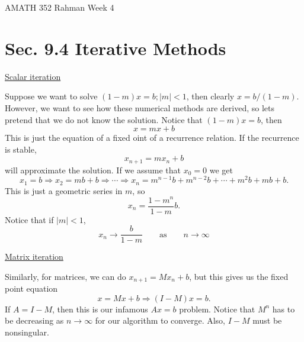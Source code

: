 \documentclass[reqno]{amsart}
\theoremstyle{definition}
\begin{document}
\begin{flushleft}
{\sc \Large AMATH 352 Rahman} \hfill Week 4
\bigskip
\end{flushleft}

\newcommand{\R}{\mathbb{R}}
\newcommand{\N}{\mathbb{N}}
\newcommand{\Z}{\mathbb{Z}}
\newcommand{\Q}{\mathbb{Q}}
\renewcommand{\CancelColor}{\color{red}}
\newcommand{\?}{\stackrel{?}{=}}
\renewcommand{\varphi}{\phi}
\newcommand{\card}{\text{Card}}
\newcommand{\bigzero}{\text{\Huge 0}}
\newcommand{\curvearrowdown}{{\color{red}\rotatebox{90}{$\curvearrowleft$}}}
\newcommand{\curvearrowup}{{\color{red}\rotatebox{90}{$\curvearrowright$}}}



\section*{Sec. 9.4 Iterative Methods}

\bigskip

\underline{\color{blue}Scalar iteration}

Suppose we want to solve $(1-m)x = b; |m| < 1$, then clearly $x = b/(1-m)$.  However, we want to see how these numerical methods are derived, so lets pretend that we do not know the solution.  Notice that $(1-m)x = b$, then
%
\begin{equation}
x = mx + b
\end{equation}
%
This is just the equation of a fixed oint of a recurrence relation.  If the recurrence is stable,
%
\begin{equation}
x_{n+1} = mx_n + b
\end{equation}
%
will approximate the solution.  If we assume that $x_0 = 0$ we get
%
\begin{equation*}
x_1 = b \Rightarrow x_2 = mb + b \Rightarrow \cdots \Rightarrow x_n = m^{n-1}b + m^{n-2}b + \cdots + m^2b + mb + b.
\end{equation*}
%
This is just a geometric series in $m$, so
%
\begin{equation}
x_n = \frac{1-m^n}{1-m}b.
\end{equation}
%
Notice that if $|m| < 1$,
%
\begin{equation*}
x_n \rightarrow \frac{b}{1-m} \qquad \text{as} \qquad n \rightarrow \infty
\end{equation*}

\bigskip

\underline{\color{blue}Matrix iteration}

Similarly, for matrices, we can do $x_{n+1} = Mx_n + b$, but this gives us the fixed point equation
%
\begin{equation}
x = Mx + b \Rightarrow (I-M)x = b.
\end{equation}
%
If $A = I - M$, then this is our infamous $Ax = b$ problem.  Notice that $M^n$ has to be decreasing as $n \rightarrow \infty$ for our algorithm to converge.  Also, $I - M$ must be nonsingular.
\end{document}
